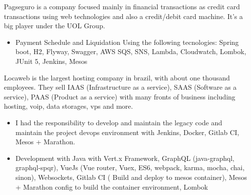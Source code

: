 \documentclass[10pt,a4paper]{altacv}
\begin{document}
\divider

Pagseguro is a company focused mainly in financial transactions as credit card transactions using web technologies and also a credit/debit card machine. It's a big player under the UOL Group.
\linebreak

\begin{itemize}
\item Payment Schedule and Liquidation Using the following tecnologies: Spring boot, H2, Flyway, Swagger, AWS SQS, SNS, Lambda, Cloudwatch, Lombok, JUnit 5, Jenkins, Mesos
\end{itemize}

\divider

Locaweb is the largest hosting company in brazil, with about one thousand employees. They sell IAAS (Infrastructure as a service), SAAS (Software as a service), PAAS (Product as a service) with many fronts of business including hosting, voip, data storages, vps and more.
\linebreak
\begin{itemize}
\item I had the responsibility to develop and maintain the legacy code and maintain the project devops environment with Jenkins, Docker, Gitlab CI, Mesos + Marathon.
\item Development with Java with Vert.x Framework, GraphQL (java-graphql, graphql-spqr), VueJs (Vue router, Vuex, ES6, webpack, karma, mocha, chai, sinon), Websockets, Gitlab CI ( Build and deploy to mesos container), Mesos + Marathon config to build the container environment, Lombok

\end{itemize}
\divider

\clearpage
\end{document}
